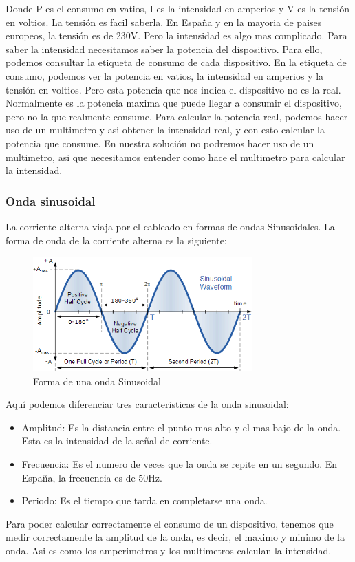 \begin{titlepage}
Donde P es el consumo en vatios, I es la intensidad en amperios y V es la tensión en voltios. La tensión es facil saberla. En España y en la mayoria de paises europeos, la tensión es de 230V. Pero la intensidad es algo mas complicado. Para saber la intensidad necesitamos saber la potencia del dispositivo. Para ello, podemos consultar la etiqueta de consumo de cada dispositivo. En la etiqueta de consumo, podemos ver la potencia en vatios, la intensidad en amperios y la tensión en voltios. Pero esta potencia que nos indica el dispositivo no es la real. Normalmente es la potencia maxima que puede llegar a consumir el dispositivo, pero no la que realmente consume. Para calcular la potencia real, podemos hacer uso de un multimetro y asi obtener la intensidad real, y con esto calcular la potencia que consume. En nuestra solución no podremos hacer uso de un multimetro, asi que necesitamos entender como hace el multimetro para calcular la intensidad. \\

\subsubsection{Onda sinusoidal}
La corriente alterna viaja por el cableado en formas de ondas Sinusoidales. La forma de onda de la corriente alterna es la siguiente: \\ 

\begin{figure}[h!]
	\centering
	\includegraphics[width=0.75\textwidth]{imagenes/sine_wave.png}
	\caption{Forma de una onda Sinusoidal\cite{sine_wave_img}}
\end{figure}
\newpage
Aquí podemos diferenciar tres caracteristicas de la onda sinusoidal\cite{ref2}: \\
\begin{itemize}
	\item Amplitud: Es la distancia entre el punto mas alto y el mas bajo de la onda. Esta es la intensidad de la señal de corriente.
	\item Frecuencia: Es el numero de veces que la onda se repite en un segundo. En España, la frecuencia es de 50Hz.
	\item Periodo: Es el tiempo que tarda en completarse una onda.
\end{itemize}
Para poder calcular correctamente el consumo de un dispositivo, tenemos que medir correctamente la amplitud de la onda, es decir, el maximo y minimo de la onda. Asi es como los amperimetros y los multimetros calculan la intensidad. \\

\end{titlepage}
